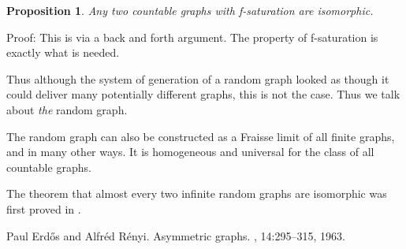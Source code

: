 \documentclass[12pt]{article}
\newtheorem{pp}{Proposition}
\begin{document}
\begin{pp} Any two countable graphs with f-saturation are isomorphic.\end{pp}
Proof: This is via a back and forth argument. The property of f-saturation is exactly what is needed.

\medskip

Thus although the system of generation of a random graph looked as though it could deliver many potentially different graphs, this is not the case.  Thus we talk about \emph{the} random graph.


\medskip

The random graph can also be constructed as a Fraisse limit of all finite graphs, and in many other ways.  It is homogeneous and universal for the class of all countable graphs.

The theorem that almost every two infinite random graphs are isomorphic was first proved in \cite{cite:erdos_renyi_randgr}.

\begin{thebibliography}{1}

Paul Erd{\H{o}}s and Alfr{\'e}d R{\'e}nyi.
\newblock Asymmetric graphs.
, 14:295--315, 1963.

\end{thebibliography}
%
%
\end{document}
